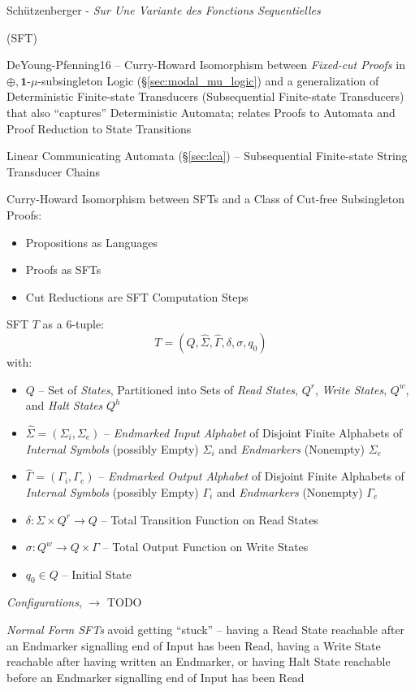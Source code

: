 Sch\"utzenberger - \emph{Sur Une Variante des Fonctions Sequentielles}

(SFT)

DeYoung-Pfenning16 -- Curry-Howard Isomorphism between \emph{Fixed-cut
  Proofs} in $\oplus,\mathbf{1}$-$\mu$-subsingleton Logic
(\S\ref{sec:modal_mu_logic}) and a generalization of Deterministic
Finite-state Transducers (Subsequential Finite-state Transducers) that
also ``captures'' Deterministic Automata; relates Proofs to Automata
and Proof Reduction to State Transitions

Linear Communicating Automata (\S\ref{sec:lca}) -- Subsequential
Finite-state String Transducer Chains

Curry-Howard Isomorphism between SFTs and a Class of Cut-free
Subsingleton Proofs:
\begin{itemize}
  \item Propositions as Languages
  \item Proofs as SFTs
  \item Cut Reductions are SFT Computation Steps
\end{itemize}

SFT $T$ as a 6-tuple:
\[
  T = (Q, \hat{\Sigma}, \hat{\Gamma}, \delta, \sigma, q_0)
\]
with:
\begin{itemize}
  \item $Q$ -- Set of \emph{States}, Partitioned into Sets of
    \emph{Read States}, $Q^r$, \emph{Write States}, $Q^w$, and
    \emph{Halt States} $Q^h$
  \item $\hat{\Sigma} = (\Sigma_i,\Sigma_e)$ -- \emph{Endmarked Input
    Alphabet} of Disjoint Finite Alphabets of \emph{Internal Symbols}
    (possibly Empty) $\Sigma_i$ and \emph{Endmarkers} (Nonempty)
    $\Sigma_e$
  \item $\hat{\Gamma} = (\Gamma_i,\Gamma_e)$ -- \emph{Endmarked Output
    Alphabet} of Disjoint Finite Alphabets of \emph{Internal Symbols}
    (possibly Empty) $\Gamma_i$ and \emph{Endmarkers} (Nonempty)
    $\Gamma_e$
  \item $\delta : \Sigma \times Q^r \rightarrow Q$ -- Total Transition
    Function on Read States
  \item $\sigma : Q^w \rightarrow Q \times \Gamma$ -- Total Output
    Function on Write States
  \item $q_0 \in Q$ -- Initial State
\end{itemize}

\emph{Configurations}, $\longrightarrow$ TODO

\emph{Normal Form SFTs} avoid getting ``stuck'' -- having a Read State
reachable after an Endmarker signalling end of Input has been Read,
having a Write State reachable after having written an Endmarker, or
having Halt State reachable before an Endmarker signalling end of
Input has been Read


